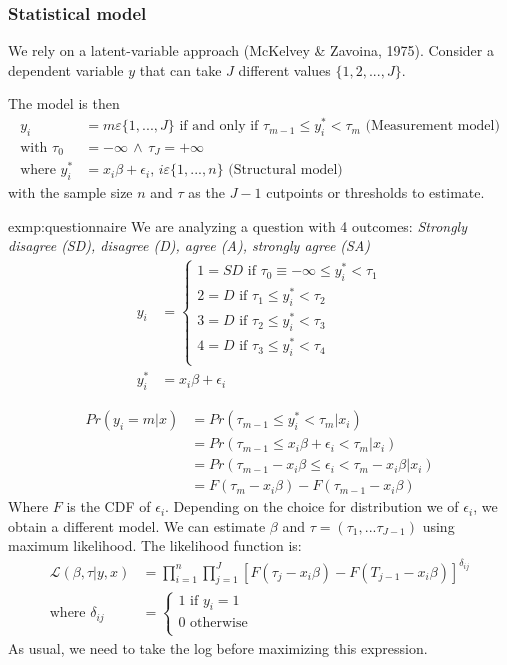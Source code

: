 		\subsubsection{Statistical model}
			We rely on a latent-variable approach (McKelvey \& Zavoina, 1975). Consider a dependent variable $y$ that can take $J$ different values $\{1,2,...,J\}$.
			
			The model is then
			\begin{align*}
				y_i&=m\varepsilon\{1,...,J\}\text{ if and only if }\tau_{m-1}\leq y_i^*<\tau_m\text{ (Measurement model)}\\
				\text{with }\tau_0&=-\infty\,\wedge\,\tau_J=+\infty\\
				\text{where }y^*_i&=x_i \beta+\epsilon_i,\,i\varepsilon\{1,...,n\}\text{ (Structural model)}
			\end{align*}
			with the sample size $n$ and $\tau$ as the $J-1$ cutpoints or thresholds to estimate.
			\begin{exmp}{exmp:questionnaire}
				We are analyzing a question with 4 outcomes:
				\textit{Strongly disagree (SD), disagree (D), agree (A), strongly agree (SA)}
				\begin{align*}
					y_i&=\begin{cases}
						1=SD\text{ if }\tau_0\equiv -\infty \leq y_i^* < \tau_1\\
						2=D\text{ if }\tau_1 \leq y_i^* < \tau_2\\
						3=D\text{ if }\tau_2 \leq y_i^* < \tau_3\\
						4=D\text{ if }\tau_3 \leq y_i^* < \tau_4\\
					\end{cases}\\
					y_i^*&=x_i \beta + \epsilon_i
				\end{align*}
			\end{exmp}
			\begin{align*}
				Pr(y_i=m|x)&=Pr(\tau_{m-1}\leq y_i^* < \tau_m | x_i)\\
				&=Pr(\tau_{m-1}\leq x_i\beta+\epsilon_i < \tau_m | x_i)\\
				&=Pr(\tau_{m-1}- x_i\beta \leq \epsilon_i < \tau_m -x_i \beta| x_i)\\	
				&=F(\tau_m-x_i\beta)-F(\tau_{m-1}-x_i \beta)
			\end{align*}
			Where $F$ is the CDF of $\epsilon_i$. Depending on the choice for distribution we of $\epsilon_i$, we obtain a different model. 	
			We can estimate $\beta$ and $\tau=(\tau_1,...\tau_{J-1})$ using maximum likelihood. The likelihood function is:
			\begin{align*}
				\mathcal{L}(\beta,\tau|y,x)&=\prod_{i=1}^{n} \prod_{j=1}^{J} \left[F(\tau_j -x_i \beta)-F(T_{j-1}-x_i \beta)\right]^{\delta_{ij}}\\
				\text{where }\delta_{ij}&=\begin{cases}
					1\text{ if }y_i=1\\
					0\text{ otherwise}\\
				\end{cases}
			\end{align*}
			As usual, we need to take the log before maximizing this expression.
			
